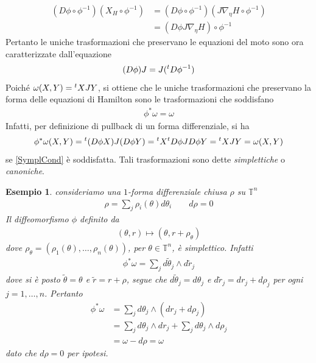 \documentclass[twoside, 11pt]{amsbook}
\newcommand{\0}{{(0)}}
\newcommand{\3}{{(3)}}
\theoremstyle{colonplain}
\theoremstyle{colondefinition}
\newtheorem{ex}[thm]{Esempio}
\theoremstyle{colonremark}
\numberwithin{equation}{chapter}
\begin{document}
\begin{align}
    (D\phi \circ \phi^{-1})(X_H \circ \phi^{-1}) &= (D\phi \circ \phi^{-1})(J\nabla_\eta H \circ \phi^{-1}) \\
    &= (D\phi J\nabla_\eta H) \circ \phi^{-1}
\end{align}
Pertanto le uniche trasformazioni che preservano le equazioni del moto sono ora caratterizzate dall'equazione
\begin{align}\label{SymplCond}
    (D\phi) J = J(\null^tD\phi^{-1})
\end{align}
Poiché $\omega(X, Y) = \null^t X J Y$, si ottiene che le uniche trasformazioni che preservano la forma delle equazioni di Hamilton sono le trasformazioni che soddisfano
\begin{align}
    \phi^*\omega = \omega
\end{align}
Infatti, per definizione di pullback di un forma differenziale, si ha
\begin{align}
    \phi^*\omega(X, Y) = \null^t(D\phi X)J(D\phi Y) = \null^tX \null^tD\phi J D\phi Y = \null^tX J Y = \omega(X, Y)
\end{align}
se \eqref{SymplCond} è soddisfatta. Tali trasformazioni sono dette \textit{simplettiche} o \textit{canoniche}.
\begin{ex} consideriamo una $1$-forma differenziale chiusa $\rho$ su $\mathbb{T}^n$
\begin{align}
    \rho = \sum_j \rho_i(\theta)d\theta_i \qquad d\rho = 0 
\end{align}
Il diffeomorfismo $\phi$ definito da 
\begin{align}
    (\theta, r) \mapsto (\theta, r + \rho_\theta) 
\end{align}
dove $\rho_\theta = (\rho_1(\theta), \dots, \rho_n(\theta))$, per $\theta \in \mathbb{T}^n$, è simplettico. Infatti
\begin{align}
    \phi^*\omega = \sum_j d\tilde{\theta}_j \wedge d\tilde{r}_j 
\end{align}
dove si è posto $\tilde{\theta} = \theta$ e $\tilde{r} = r + \rho$, segue che $d\tilde{\theta}_j = d\theta_j$ e $d\tilde{r}_j = dr_j + d\rho_j$ per ogni $j = 1, \dots, n$. Pertanto
\begin{align}
    \phi^*\omega &= \sum_j d\theta_j \wedge (dr_j + d\rho_j) \\
    &= \sum_j d\theta_j \wedge dr_j + \sum_j d\theta_j \wedge d\rho_j \\
    &= \omega - d\rho = \omega 
\end{align}
dato che $d\rho = 0$ per ipotesi.
\end{ex}
\end{document}
